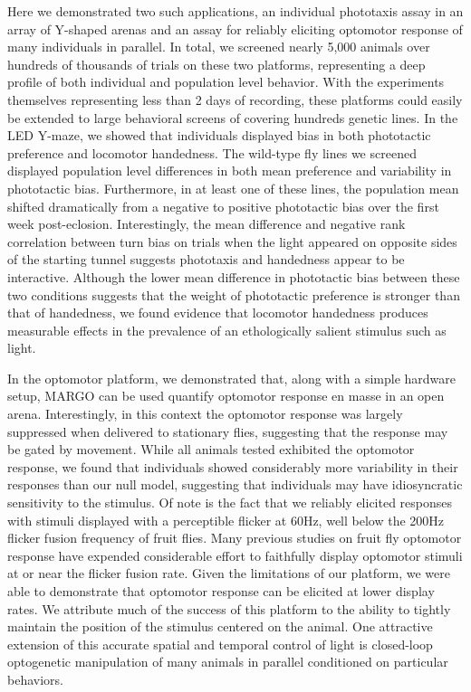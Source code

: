 \documentclass[10pt]{article}
\begin{document}
\begin{multicols}{2}
Here we demonstrated two such applications, an individual phototaxis assay in an array of Y-shaped arenas and an assay for reliably eliciting optomotor response of many individuals in parallel. In total, we screened nearly 5,000 animals over hundreds of thousands of trials on these two platforms, representing a deep profile of both individual and population level behavior. With the experiments themselves representing less than 2 days of recording, these platforms could easily be extended to large behavioral screens of covering hundreds genetic lines. In the LED Y-maze, we showed that individuals displayed bias in both phototactic preference and locomotor handedness. The wild-type fly lines we screened displayed population level differences in both mean preference and variability in phototactic bias. Furthermore, in at least one of these lines, the population mean shifted dramatically from a negative to positive phototactic bias over the first week post-eclosion. Interestingly, the mean difference and negative rank correlation between turn bias on trials when the light appeared on opposite sides of the starting tunnel suggests phototaxis and handedness appear to be interactive. Although the lower mean difference in phototactic bias between these two conditions suggests that the weight of phototactic preference is stronger than that of handedness, we found evidence that locomotor handedness produces measurable effects in the prevalence of an ethologically salient stimulus such as light. 

In the optomotor platform, we demonstrated that, along with a simple hardware setup, MARGO can be used quantify optomotor response en masse in an open arena. Interestingly, in this context the optomotor response was largely suppressed when delivered to stationary flies, suggesting that the response may be gated by movement. While all animals tested exhibited the optomotor response, we found that individuals showed considerably more variability in their responses than our null model, suggesting that individuals may have idiosyncratic sensitivity to the stimulus. Of note is the fact that we reliably elicited responses with stimuli displayed with a perceptible flicker at 60Hz, well below the 200Hz flicker fusion frequency of fruit flies. Many previous studies on fruit fly optomotor response have expended considerable effort to faithfully display optomotor stimuli at or near the flicker fusion rate. Given the limitations of our platform, we were able to demonstrate that optomotor response can be elicited at lower display rates. We attribute much of the success of this platform to the ability to tightly maintain the position of the stimulus centered on the animal. One attractive extension of this accurate spatial and temporal control of light is closed-loop optogenetic manipulation of many animals in parallel conditioned on particular behaviors.


\end{multicols}
\end{document}
